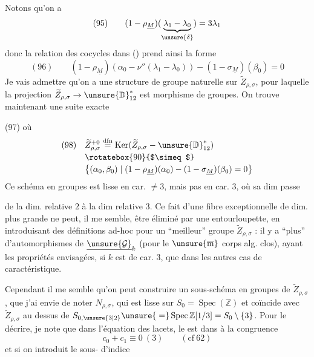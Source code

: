 Notons qu'on a
\[
(95)\qquad (1-\rho_{\underline M})
(\underbrace{\lambda_1-\lambda_0}_{\unsure{\delta}})=3\lambda_1
\]
donc la relation des cocycles dans ()
prend ainsi la forme
\[
(96)\qquad
(1-\rho_{\underline M})(\alpha_0-\nu''(\lambda_1-\lambda_0))
-(1-\sigma_{\underline M})(\beta_0)=0
\]
Je vais admettre  qu'on a une structure de groupe naturelle sur
$\widetilde Z_{\rho,\sigma}$, pour laquelle la projection
$\widetilde Z_{\rho,\sigma}\to\unsure{\mathbb D}_{12}^{*}$
est morphisme de groupes. On trouve maintenant une suite exacte

(97)
où
\[
\begin{aligned}
(98)\quad&\widetilde Z_{\rho,\sigma}^{+0}
\overset{\mathrm{dfn}}=\operatorname{Ker}
(\widetilde Z_{\rho,\sigma}\mathbin{-}\unsure{\mathbb D}_{12}^{*})\\[-2pt]
&\rotatebox{90}{$\simeq$}\\[-2pt]
&\bigl\{(\alpha_0,\beta_0)\mid
(1-\rho_{\underline M})(\alpha_0)-(1-\sigma_{\underline M})(\beta_0)=0\bigr\}
\end{aligned}
\]
Ce schéma en groupes est lisse en car. $\ne3$, mais pas en car. $3$, où sa dim passe


de la dim. relative $2$ à la dim relative $3$.
Ce fait d'une fibre exceptionnelle de dim. plus grande ne peut, il me semble, être
éliminé par une entourloupette,  en introduisant
 des définitions ad-hoc pour un ``meilleur'' groupe
$\widetilde Z_{\rho,\sigma}$ : il y a ``plus'' d'automorphismes de
$\underline{\unsure{\mathcal G}}_k$ (pour le $\unsure{\overline{\mathrm m}}$
corps alg. clos), ayant les propriétés envisagées, si $k$ est de car. $3$, que dans les autres cas de caractéristique.

Cependant il me semble qu'on peut construire un sous-schéma en groupes
 de $\widetilde Z_{\rho,\sigma}$, que j'ai envie de noter
$N_{\rho,\sigma}$, qui est lisse sur $S_0=\operatorname{Spec}(\mathbb Z)$ et
coïncide avec $\widetilde Z_{\rho,\sigma}$ au dessus de
$S_{0,\unsure{3|2}}\unsure{{}=}\operatorname{Spec}\mathbb Z[1/3]=S_0\setminus\{3\}$.
Pour le décrire, je note que dans l'équation des lacets,
le  est
 dans
à la congruence
\[
c_0+c_1\equiv0\ (3)\qquad(\mathrm{cf}\ 62)
\]
et si on introduit le sous- d'indice

